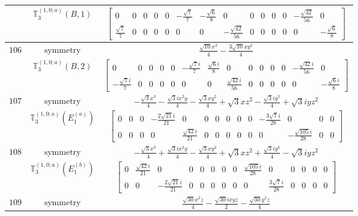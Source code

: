 \documentclass[fleqn,8pt,landscape]{jsarticle}
\begin{document}
\begin{longtable}{ccc}
$  $ & $ \mathbb{T}_{3}^{(1,0;a)}(B,1) $ & $ \begin{bmatrix} 0 & 0 & 0 & 0 & 0 & - \frac{\sqrt{7}}{7} & - \frac{\sqrt{6}}{8} & 0 & 0 & 0 & 0 & 0 & - \frac{\sqrt{42}}{56} & 0 \\ \frac{\sqrt{7}}{7} & 0 & 0 & 0 & 0 & 0 & 0 & - \frac{\sqrt{42}}{56} & 0 & 0 & 0 & 0 & 0 & - \frac{\sqrt{6}}{8} \end{bmatrix} $ \\ \hline
$ 106 $ & $ \text{symmetry} $ & $ \frac{\sqrt{10} x^{3}}{4} - \frac{3 \sqrt{10} x y^{2}}{4} $ \\
$  $ & $ \mathbb{T}_{3}^{(1,0;a)}(B,2) $ & $ \begin{bmatrix} 0 & 0 & 0 & 0 & 0 & - \frac{\sqrt{7} i}{7} & \frac{\sqrt{6} i}{8} & 0 & 0 & 0 & 0 & 0 & - \frac{\sqrt{42} i}{56} & 0 \\ - \frac{\sqrt{7} i}{7} & 0 & 0 & 0 & 0 & 0 & 0 & \frac{\sqrt{42} i}{56} & 0 & 0 & 0 & 0 & 0 & - \frac{\sqrt{6} i}{8} \end{bmatrix} $ \\ \hline
$ 107 $ & $ \text{symmetry} $ & $ - \frac{\sqrt{3} x^{3}}{4} - \frac{\sqrt{3} i x^{2} y}{4} - \frac{\sqrt{3} x y^{2}}{4} + \sqrt{3} x z^{2} - \frac{\sqrt{3} i y^{3}}{4} + \sqrt{3} i y z^{2} $ \\
$  $ & $ \mathbb{T}_{3}^{(1,0;a)}(E_{1}^{(a)}) $ & $ \begin{bmatrix} 0 & 0 & 0 & - \frac{2 \sqrt{21} i}{21} & 0 & 0 & 0 & 0 & 0 & 0 & - \frac{3 \sqrt{7} i}{28} & 0 & 0 & 0 \\ 0 & 0 & 0 & 0 & \frac{\sqrt{42} i}{21} & 0 & 0 & 0 & 0 & 0 & 0 & - \frac{\sqrt{105} i}{28} & 0 & 0 \end{bmatrix} $ \\ \hline
$ 108 $ & $ \text{symmetry} $ & $ - \frac{\sqrt{3} x^{3}}{4} + \frac{\sqrt{3} i x^{2} y}{4} - \frac{\sqrt{3} x y^{2}}{4} + \sqrt{3} x z^{2} + \frac{\sqrt{3} i y^{3}}{4} - \sqrt{3} i y z^{2} $ \\
$  $ & $ \mathbb{T}_{3}^{(1,0;a)}(E_{1}^{(b)}) $ & $ \begin{bmatrix} 0 & \frac{\sqrt{42} i}{21} & 0 & 0 & 0 & 0 & 0 & 0 & \frac{\sqrt{105} i}{28} & 0 & 0 & 0 & 0 & 0 \\ 0 & 0 & - \frac{2 \sqrt{21} i}{21} & 0 & 0 & 0 & 0 & 0 & 0 & \frac{3 \sqrt{7} i}{28} & 0 & 0 & 0 & 0 \end{bmatrix} $ \\ \hline
$ 109 $ & $ \text{symmetry} $ & $ \frac{\sqrt{30} x^{2} z}{4} - \frac{\sqrt{30} i x y z}{2} - \frac{\sqrt{30} y^{2} z}{4} $ \\

\end{longtable}
\end{document}
